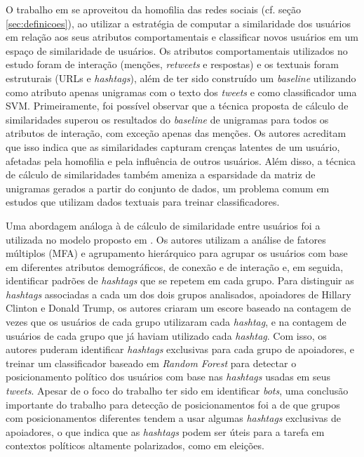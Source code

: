 \documentclass[
	12pt, oneside, a4paper, english, brazil
]{abntex2ppgsi}
\begin{document}
O trabalho em  se aproveitou da homofilia das redes sociais (cf. seção \ref{sec:definicoes}), ao utilizar a estratégia de computar a similaridade dos usuários em relação aos seus atributos comportamentais e classificar novos usuários em um espaço de similaridade de usuários. Os atributos comportamentais utilizados no estudo foram de interação (menções, {\em retweets} e respostas) e os textuais foram estruturais (URLs e {\em hashtags}), além de ter sido construído um {\em baseline} utilizando como atributo apenas unigramas com o texto dos {\em tweets} e como classificador uma SVM. Primeiramente, foi possível observar que a técnica proposta de cálculo de similaridades superou os resultados do {\em baseline} de unigramas para todos os atributos de interação, com exceção apenas das menções. Os autores acreditam que isso indica que as similaridades capturam crenças latentes de um usuário, afetadas pela homofilia e pela influência de outros usuários. Além disso, a técnica de cálculo de similaridades também ameniza a esparsidade da matriz de unigramas gerados a partir do conjunto de dados, um problema comum em estudos que utilizam dados textuais para treinar classificadores. 

Uma abordagem análoga à de cálculo de similaridade entre usuários foi a utilizada no modelo proposto em . Os autores utilizam a análise de fatores múltiplos (MFA) e agrupamento hierárquico para agrupar os usuários com base em diferentes atributos demográficos, de conexão e de interação e, em seguida, identificar padrões de {\em hashtags} que se repetem em cada grupo. Para distinguir as {\em hashtags} associadas a cada um dos dois grupos analisados, apoiadores de Hillary Clinton e Donald Trump, os autores criaram um escore baseado na contagem de vezes que os usuários de cada grupo utilizaram cada {\em hashtag}, e na contagem de usuários de cada grupo que já haviam utilizado cada {\em hashtag}. Com isso, os autores puderam identificar {\em hashtags} exclusivas para cada grupo de apoiadores, e treinar um classificador baseado em {\em Random Forest} para detectar o posicionamento político dos usuários com base nas {\em hashtags} usadas em seus {\em tweets}. Apesar de o foco do trabalho ter sido em identificar {\em bots}, uma conclusão importante do trabalho para detecção de posicionamentos foi a de que grupos com posicionamentos diferentes tendem a usar algumas {\em hashtags} exclusivas de apoiadores, o que indica que as {\em hashtags} podem ser úteis para a tarefa em contextos políticos altamente polarizados, como em eleições.
\end{document}

